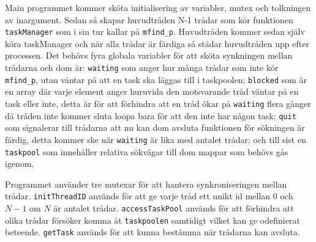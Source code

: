 Main programmet kommer sköta initialisering av variabler, mutex och tolkningen av inargument.
Sedan så skapar huvudtråden N-1 trådar som kör funktionen \texttt{taskManager} som i sin tur kallar på \texttt{mfind\_p}. Huvudtråden kommer sedan själv köra taskManager och när alla trådar är färdiga så städar huvudtråden upp efter processen.
Det behövs fyra globala variabler för att sköta synkningen mellan trådarna och dom är:
\texttt{waiting} som anger hur många trådar som inte kör \texttt{mfind\_p}, utan väntar på att en task ska läggas till i taskpoolen; \texttt{blocked} som är en array där varje element anger huruvida den motsvarande tråd väntar på en task eller inte, detta är för att förhindra att en tråd ökar på \texttt{waiting} flera gånger då tråden inte kommer sluta loopa bara för att den inte har någon task; \texttt{quit} som signalerar till trådarna att nu kan dom avsluta funktionen för sökningen är färdig, detta kommer ske när \texttt{waiting} är lika med antalet trådar; och till sist en \texttt{taskpool} som innehåller relativa sökvägar till dom mappar som behövs gås igenom.

\def\accessTaskPoolMutex{accessTaskPool}
\def\getTaskMutex{getTask}
\def\initThreadIDMutex{initThreadID}
Programmet använder tre mutexar för att hantera synkroniseringen mellan trådar.
\texttt{\initThreadIDMutex} används för att ge varje tråd ett unikt id mellan 0 och $N-1$ om $N$ är antalet trådar.
\texttt{\accessTaskPoolMutex} används för att förhindra att olika trådar försöker komma åt \texttt{taskpoolen} samtidigt vilket kan ge odefinierat beteende.
\texttt{\getTaskMutex} används för att kunna bestämma när trådarna kan avsluta.

